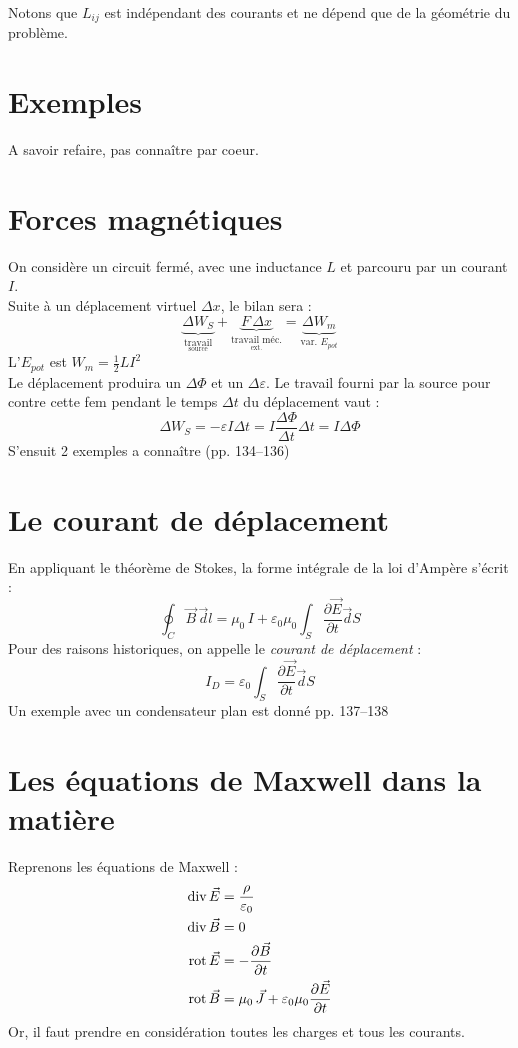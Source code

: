 \documentclass[11pt, a4paper, openany]{book}
\begin{document}
		Notons que $L_{ij}$ est indépendant des courants et ne dépend que de la géométrie du problème. 
		\section{Exemples}
		A savoir refaire, pas connaître par coeur.
		\section{Forces magnétiques}
		On considère un circuit fermé, avec une inductance $L$ et parcouru par un courant $I$.\\Suite à un déplacement virtuel $\Delta x$, le bilan sera : \begin{equation}
		\underbrace{\Delta W_S}_{\underset{\text{source}}{\text{travail}}}+\underbrace{F\,\Delta x}_{\underset{\text{ext.}}{\text{travail méc.}}}=\underbrace{\Delta W_m}_{\text{var. }E_{pot}}
		\end{equation}
		L'$E_{pot}$ est $W_m=\frac{1}{2}LI^2$\\ 
		Le déplacement produira un $\Delta\Phi$ et un $\Delta\varepsilon$. Le travail fourni par la source pour contre cette fem pendant le temps $\Delta t$ du déplacement vaut : \begin{equation}
		\Delta W_S=-\varepsilon I\Delta t=I\frac{\Delta\Phi}{\Delta t}\Delta t=I\Delta\Phi
		\end{equation}
		S'ensuit 2 exemples a connaître (pp. 134--136)
		\section{Le courant de déplacement}
		En appliquant le théorème de Stokes, la forme intégrale de la loi d'Ampère s'écrit :\begin{equation}
		\oint_C\vec B\,\vec dl=\mu_0\,I+\varepsilon_0\mu_0\int_S\frac{\partial\vec E}{\partial t}\vec dS
		\end{equation}
		Pour des raisons historiques, on appelle le \textit{courant de déplacement} :\begin{equation}
		I_D=\varepsilon_0\int_S\frac{\partial\vec E}{\partial t}\vec dS
		\end{equation}
		Un exemple avec un condensateur plan est donné pp. 137--138
		\section{Les équations de Maxwell dans la matière}
		Reprenons les équations de Maxwell : \begin{align}\label{eqmaxwell}
		\divv\vec E & = \frac{\rho}{\varepsilon_0}\\
		\divv\vec B & =0\\
		\rot\vec E & =-\frac{\partial \vec B}{\partial t}\\
		\label{eqampmax}
		\rot\vec B & = \mu_0\,\vec J+\varepsilon_0\mu_0\frac{\partial \vec E}{\partial t}
		\end{align}
		Or, il faut prendre en considération toutes les charges et tous les courants.\\
		
\end{document}
